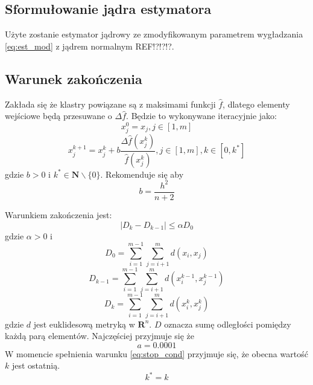 \subsection{Sformułowanie jądra estymatora}
\label{subsec:jadro_estymatora}
Użyte zostanie estymator jądrowy ze zmodyfikowanym parametrem wygładzania \ref{eq:est_mod} z jądrem normalnym REF!?!?!?.

\subsection{Warunek zakończenia}
\label{subsec:stop_cond}
Zakłada się że klastry powiązane są z maksimami funkcji $\hat{
f}$, dlatego elementy wejściowe będą przesuwane o $\Delta\hat{f}$. Będzie to wykonywane iteracyjnie jako:
\begin{equation}
x^0_j=x_j, j\in [1,m]
\end{equation}
\begin{equation}
x^{k+1}_j=x^k_j+b\frac{\Delta\hat{f}(x^k_j)}{\hat{f}(x^k_j)}, j \in [1,m], k \in [0,k^*]
\end{equation}
gdzie $b > 0$ i $k^* \in \mathbf{N} \backslash \{0\}$. Rekomenduje się aby
\begin{equation}
b=\frac{h^2}{n+2}
\end{equation} 

Warunkiem zakończenia jest:
\begin{equation} \label{eq:stop_cond}
|D_k-D_{k-1}| \leq \alpha D_0
\end{equation}
gdzie $\alpha>0$ i 
\begin{equation}
D_0 = \displaystyle\sum_{i=1}^{m-1} \displaystyle\sum_{j=i+1}^{m} d(x_i, x_j)
\end{equation}
\begin{equation}
D_{k-1} = \displaystyle\sum_{i=1}^{m-1} \displaystyle\sum_{j=i+1}^{m} d(x_i^{k-1}, x_j^{k-1})
\end{equation}
\begin{equation}
D_{k} = \displaystyle\sum_{i=1}^{m-1} \displaystyle\sum_{j=i+1}^{m} d(x_i^{k}, x_j^{k})
\end{equation}
gdzie $d$ jest euklidesową metryką w $\mathbf{R}^n$. $D$ oznacza sumę odległości pomiędzy każdą parą elementów. Najczęściej przyjmuje się że
\begin{equation}
a= 0.0001
\end{equation}
W momencie spełnienia warunku \ref{eq:stop_cond} przyjmuje się, że obecna wartość $k$ jest ostatnią.
\begin{equation}
k^*=k
\end{equation}

